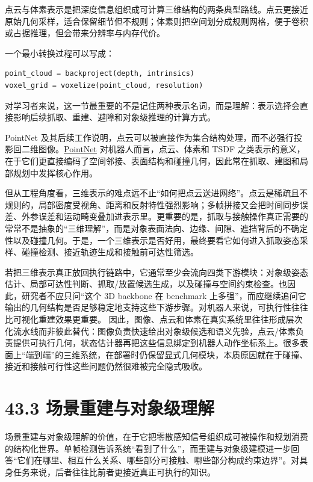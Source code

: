 点云与体素表示是把深度信息组织成可计算三维结构的两条典型路线。点云更接近原始几何采样，适合保留细节但不规则；体素则把空间划分成规则网格，便于卷积或占据推理，但会带来分辨率与内存代价。

一个最小转换过程可以写成：

\begin{lstlisting}[language=python]
point_cloud = backproject(depth, intrinsics)
voxel_grid = voxelize(point_cloud, resolution)
\end{lstlisting}

对学习者来说，这一节最重要的不是记住两种表示名词，而是理解：表示选择会直接影响后续抓取、重建、避障和对象级推理的计算方式。

PointNet 及其后续工作说明，点云可以被直接作为集合结构处理，而不必强行投影回二维图像。\href{https://arxiv.org/abs/1612.00593}{PointNet} 对机器人而言，点云、体素和 TSDF 之类表示的意义，在于它们更直接编码了空间邻接、表面结构和碰撞几何，因此常在抓取、建图和局部规划中发挥核心作用。

但从工程角度看，三维表示的难点远不止“如何把点云送进网络”。点云是稀疏且不规则的，局部密度受视角、距离和反射特性强烈影响；多帧拼接又会把时间同步误差、外参误差和运动畸变叠加进表示里。更重要的是，抓取与接触操作真正需要的常常不是抽象的“三维理解”，而是对象表面法向、边缘、间隙、遮挡背后的不确定性以及碰撞几何。于是，一个三维表示是否好用，最终要看它如何进入抓取姿态采样、碰撞检测、接近轨迹生成和接触前可达性筛选。

若把三维表示真正放回执行链路中，它通常至少会流向四类下游模块：对象级姿态估计、局部可达性判断、抓取/放置候选生成，以及碰撞与空间约束检查。也因此，研究者不应只问“这个 3D backbone 在 benchmark 上多强”，而应继续追问它输出的几何结构是否足够稳定地支持这些下游步骤。对机器人来说，可执行性往往比可视化重建效果更重要。 因此，图像、点云和体素在真实系统里往往形成层次化流水线而非彼此替代：图像负责快速给出对象级候选和语义先验，点云/体素负责提供可执行几何，状态估计器再把这些信息绑定到机器人动作坐标系上。很多表面上“端到端”的三维系统，在部署时仍保留显式几何模块，本质原因就在于碰撞、接近和接触可行性这些问题仍然很难被完全隐式吸收。

\section*{43.3 场景重建与对象级理解}


场景重建与对象级理解的价值，在于它把零散感知信号组织成可被操作和规划消费的结构化世界。单帧检测告诉系统“看到了什么”，而重建与对象级建模进一步回答“它们在哪里、相互什么关系、哪些部分可接触、哪些部分构成约束边界”。对具身任务来说，后者往往比前者更接近真正可执行的知识。

